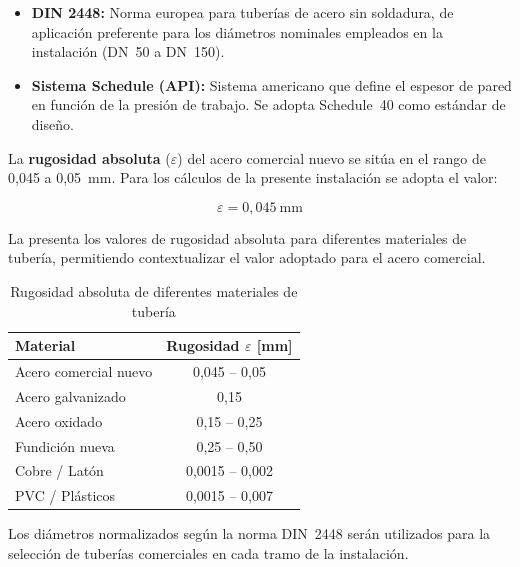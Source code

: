 \documentclass[12pt]{article}
\begin{document}
\begin{itemize}[leftmargin=2em]
	\item \textbf{DIN 2448:} Norma europea para tuberías de acero sin soldadura, de aplicación preferente para los diámetros nominales empleados en la instalación (DN~50 a DN~150).
	\item \textbf{Sistema Schedule (API):} Sistema americano que define el espesor de pared en función de la presión de trabajo. Se adopta Schedule~40 como estándar de diseño.
\end{itemize}

La \textbf{rugosidad absoluta} ($\varepsilon$) del acero comercial nuevo se sitúa en el rango de 0,045 a 0,05~mm. Para los cálculos de la presente instalación se adopta el valor:

\begin{equation}
	\varepsilon = 0{,}045 \ \text{mm}
	\label{eq:rugosidad-acero}
\end{equation}

La  presenta los valores de rugosidad absoluta para diferentes materiales de tubería, permitiendo contextualizar el valor adoptado para el acero comercial.

\begin{table}[H]
	\centering
	\caption{Rugosidad absoluta de diferentes materiales de tubería}
	\label{tab:rugosidades-materiales}
	\begin{tabular}{lc}
		\toprule
		\textbf{Material}     & \textbf{Rugosidad $\varepsilon$ [mm]} \\
		\midrule
		Acero comercial nuevo & 0,045 -- 0,05                         \\
		Acero galvanizado     & 0,15                                  \\
		Acero oxidado         & 0,15 -- 0,25                          \\
		Fundición nueva       & 0,25 -- 0,50                          \\
		Cobre / Latón         & 0,0015 -- 0,002                       \\
		PVC / Plásticos       & 0,0015 -- 0,007                       \\
		\bottomrule
	\end{tabular}
\end{table}

Los diámetros normalizados según la norma DIN~2448 serán utilizados para la selección de tuberías comerciales en cada tramo de la instalación.
\end{document}
